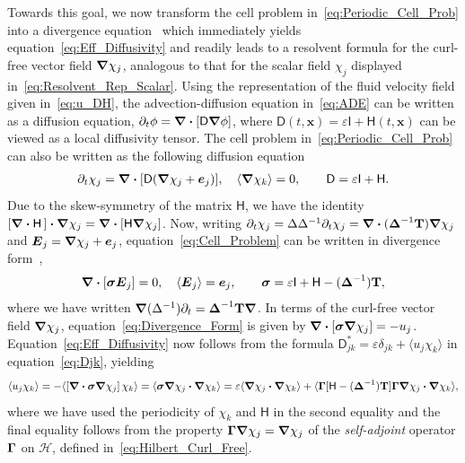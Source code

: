 \documentclass[leqno,onefignum,onetabnum]{siamltex1213}
\newcommand{\Tb}{\mathbf{T}}
\newcommand{\Hc}{\mathcal{H}}
\newcommand{\Dm}{\mathsf{D}}
\newcommand{\Hm}{\mathsf{H}}
\newcommand{\Ib}{\mathsf{I}}
\newcommand\bsig{\mbox{\boldmath${\sigma}$}}
\newcommand\bDelta{\mbox{\boldmath${\Delta}$}}
\newcommand\bGamma{\mbox{\boldmath${\Gamma}$}}
\newcommand\bnabla{\mbox{\boldmath${\nabla}$}}
\providecommand\bcdot{\boldsymbol{\cdot}}
\newcommand{\vecE}{\boldsymbol{E}}
\newcommand{\vecx}{\boldsymbol{x}}
\newcommand{\vece}{\boldsymbol{e}}
\begin{document}
Towards this goal, we now transform the cell problem
in~\eqref{eq:Periodic_Cell_Prob} into a divergence
equation~\cite{Fannjiang:1994:SIAM_JAM:333} which immediately yields
equation~\eqref{eq:Eff_Diffusivity} and readily leads to a resolvent
formula for the curl-free vector field $\bnabla\chi_j$, analogous to that
for the scalar field $\chi_j$ displayed in~\eqref{eq:Resolvent_Rep_Scalar}. Using the
representation of the fluid velocity field given in~\eqref{eq:u_DH}, the
advection-diffusion equation in~\eqref{eq:ADE} can be written as a
diffusion equation, $\partial_t\phi=\bnabla \bcdot[\Dm\bnabla\phi]$, where
$\Dm(t,\vecx)=\varepsilon\Ib+\Hm(t,\vecx)$ can be viewed as a local diffusivity
tensor. The cell problem in~\eqref{eq:Periodic_Cell_Prob} can also be
written as the following diffusion
equation~\cite{Fannjiang:1994:SIAM_JAM:333}     
% 
\begin{align}\label{eq:Cell_Problem}
  \partial_t\chi_j=\bnabla \bcdot[\Dm(\bnabla \chi_j+\vece_j)],
  \quad
  \langle\bnabla \chi_k\rangle=0, \qquad
  \Dm=\varepsilon\Ib+\Hm.
\end{align}
%
Due to the skew-symmetry of the matrix $\Hm$, we have the identity
$[\bnabla\bcdot\Hm\,]\bcdot\bnabla\chi_j=\bnabla\bcdot[\Hm\bnabla\chi_j]$.
Now, writing $\partial_t\chi_j=\Delta\Delta^{-1}\partial_t\chi_j=\bnabla\bcdot(\bDelta^{-1}\Tb)\bnabla\chi_j$ and
$\vecE_j=\bnabla\chi_j+\vece_j$, equation~\eqref{eq:Cell_Problem} can be
written in divergence form~\cite{Fannjiang:1994:SIAM_JAM:333},   
%
\begin{align}\label{eq:Divergence_Form}
  \bnabla\bcdot[\bsig\vecE_j]=0,
  \quad
  \langle\vecE_j\rangle=\vece_j,
  \qquad
  \bsig=\varepsilon\Ib+\Hm-(\bDelta^{-1})\Tb,
\end{align}
%
where we have written
$\bnabla(\Delta^{-1})\partial_t=\bDelta^{-1}\Tb\bnabla$. In terms of the curl-free
vector field $\bnabla\chi_j$, equation~\eqref{eq:Divergence_Form} is
given by
$\bnabla\bcdot[\bsig\bnabla\chi_j]=-u_j$. Equation~\eqref{eq:Eff_Diffusivity} 
now follows from the formula $\Dm^*_{jk}=\varepsilon\delta_{jk}+\langle u_j\chi_k\rangle$ in
equation~\eqref{eq:Djk}, yielding
%
\begin{align}\label{eq:Functional_Rep}
  \langle u_j\chi_k\rangle=-\langle[\bnabla\bcdot\bsig\bnabla\chi_j]\,\chi_k\rangle
       =\langle\bsig\bnabla\chi_j\bcdot\bnabla\chi_k\rangle      
       =\varepsilon\langle\bnabla\chi_j\bcdot\bnabla\chi_k\rangle
         +\langle\bGamma[\Hm-(\bDelta^{-1})\Tb]\bGamma\bnabla\chi_j\bcdot\bnabla\chi_k\rangle,       
\end{align}
%
where we have used the periodicity of $\chi_k$ and $\Hm$ in the second
equality and the final equality follows from the property
$\bGamma\bnabla\chi_j=\bnabla\chi_j$ of the \emph{self-adjoint} operator $\bGamma$ on
$\Hc$, defined in~\eqref{eq:Hilbert_Curl_Free}.
\end{document}

